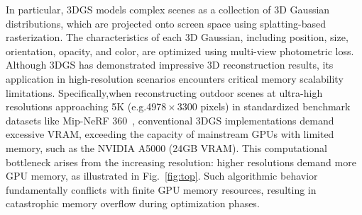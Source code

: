 In particular, 3DGS models complex scenes as a collection of 3D Gaussian distributions, which are projected onto screen space using splatting-based rasterization. The characteristics of each 3D Gaussian, including position, size, orientation, opacity, and color, are optimized using multi-view photometric loss. 
Although 3DGS has demonstrated impressive 3D reconstruction results, its application in high-resolution scenarios encounters critical memory scalability limitations. 
Specifically,when reconstructing outdoor scenes at ultra-high resolutions approaching 5K (e.g.4978\,$\times$\,3300 pixels) in standardized benchmark datasets like Mip-NeRF 360~\cite{Mip-NeRF360}, conventional 3DGS implementations demand excessive VRAM, exceeding the capacity of mainstream GPUs with limited memory, such as the NVIDIA A5000 (24GB VRAM). 
This computational bottleneck arises from the increasing resolution: higher resolutions demand more GPU memory, as illustrated in Fig.~\ref{fig:top}.
Such algorithmic behavior fundamentally conflicts with finite GPU memory resources, resulting in catastrophic memory overflow during optimization phases.

